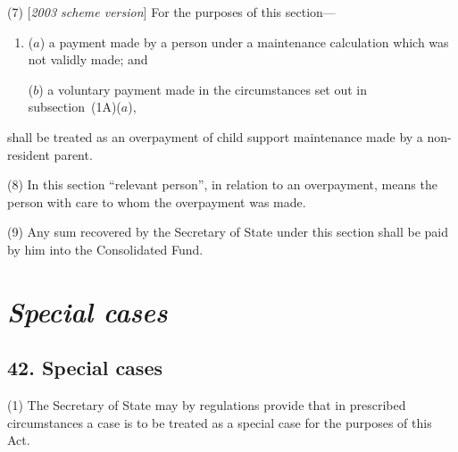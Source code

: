 \documentclass[12pt,a4paper]{article}
\begin{document}
(7) [\emph{2003 scheme version}] For the purposes of this section—
\begin{enumerate}\item[]
($a$) a payment made by a person under a maintenance calculation which was not validly made; and

($b$) a voluntary payment made in the circumstances set out in subsection~(1A)($a$),
\end{enumerate}
shall be treated as an overpayment of child support maintenance made by a non-resident parent.

(8) In this section “relevant person”, in relation to an overpayment, means the person with care to whom the overpayment was made.

(9) Any sum recovered by the Secretary of State under this section shall be paid by him into the Consolidated Fund.


\section{\itshape Special cases}

\subsection{42. Special cases}

(1) The Secretary of State may by regulations provide that in prescribed circumstances a case is to be treated as a special case for the purposes of this Act.
\end{document}

